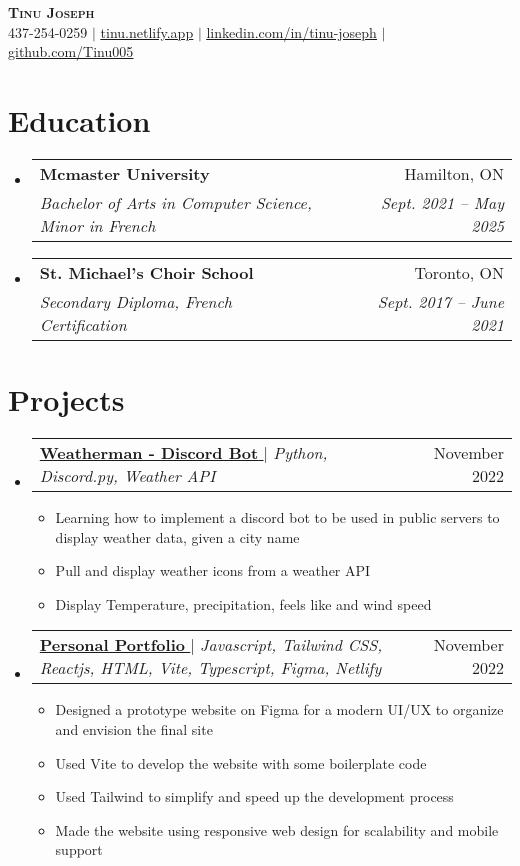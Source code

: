 \documentclass[letterpaper,11pt]{article}
\makeatletter
\newcommand{\resumeItem}[1]{
  \item\small{
    {#1 \vspace{-2pt}}
  }
}
\newcommand{\resumeSubheading}[4]{
  \vspace{-2pt}\item
    \begin{tabular*}{0.97\textwidth}[t]{l@{\extracolsep{\fill}}r}
      \textbf{#1} & #2 \\
      \textit{\small#3} & \textit{\small #4} \\
    \end{tabular*}\vspace{-7pt}
}
\newcommand{\resumeProjectHeading}[2]{
    \item
    \begin{tabular*}{0.97\textwidth}{l@{\extracolsep{\fill}}r}
      \small#1 & #2 \\
    \end{tabular*}\vspace{-7pt}
}
\newcommand{\resumeSubHeadingListStart}{\begin{itemize}[leftmargin=0.15in, label={}]}
\newcommand{\resumeSubHeadingListEnd}{\end{itemize}}
\newcommand{\resumeItemListStart}{\begin{itemize}}
\newcommand{\resumeItemListEnd}{\end{itemize}\vspace{-5pt}}
\makeatother
\begin{document}

\begin{center}
    \textbf{\Huge \scshape Tinu Joseph} \\ \vspace{1pt}
    \small 437-254-0259 $|$ \href{mailto:x@x.com}{\underline{tinu.netlify.app}} $|$ 
    \href{https://linkedin.com/in/...}{\underline{linkedin.com/in/tinu-joseph}} $|$
    \href{https://github.com/...}{\underline{github.com/Tinu005}}
\end{center}


\section{Education}
  \resumeSubHeadingListStart
    \resumeSubheading
      {Mcmaster University}{Hamilton, ON}
      {Bachelor of Arts in Computer Science, Minor in French}{Sept. 2021 -- May 2025}
    \resumeSubheading
      {St. Michael's Choir School}{Toronto, ON}
      {Secondary Diploma, French Certification}{Sept. 2017 -- June 2021}
  \resumeSubHeadingListEnd

\section{Projects}
    \resumeSubHeadingListStart
      \resumeProjectHeading
          {\href{https://github.com/Tinu005/Weatherman_Discordbot}{\textbf{Weatherman - Discord Bot \faExternalLink}} $|$ \emph{Python, Discord.py, Weather API}}{November 2022}
          \resumeItemListStart
            \resumeItem{Learning how to implement a discord bot to be used in public servers to display weather data, given a city name}
            \resumeItem{Pull and display weather icons from a weather API}
            \resumeItem{Display Temperature, precipitation, feels like and wind speed}
          \resumeItemListEnd
      \resumeProjectHeading
          {\href{https://github.com/Tinu005/my_portfolio}{\textbf{Personal Portfolio \faExternalLink}} $|$ \emph{Javascript, Tailwind CSS, Reactjs, HTML, Vite, Typescript, Figma, Netlify}}{November 2022}
          \resumeItemListStart
            \resumeItem{Designed a prototype website on Figma for a modern UI/UX to organize and envision the final site}
            \resumeItem{Used Vite to develop the website with some boilerplate code}
            \resumeItem{Used Tailwind to simplify and speed up the development process}
            \resumeItem{Made the website using responsive web design for scalability and mobile support}
          \resumeItemListEnd
    \resumeSubHeadingListEnd
\end{document}
